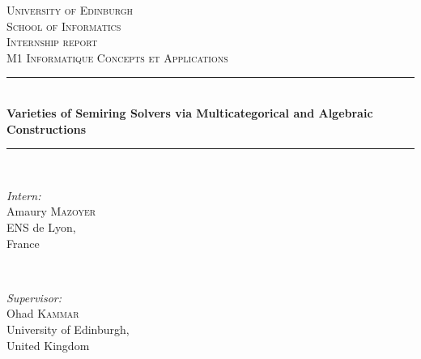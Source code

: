\documentclass[11pt]{article}
\begin{document}
\begin{titlepage}

\newcommand{\HRule}{\rule{\linewidth}{0.5mm}} %

\centering %
 

\textsc{\LARGE University of Edinburgh}\\[0.2cm]
\textsc{\Large School of Informatics}\\[1.5cm] 
\textsc{\Large Internship report}\\[0.4cm]
\textsc{\large M1 Informatique Concepts et Applications}\\[0.5cm]


\HRule \\[0.4cm]
{ \huge \bfseries Varieties of Semiring Solvers via Multicategorical and Algebraic Constructions}\\[0.4cm]
\HRule \\[1.5cm]
 

\begin{minipage}{0.4\textwidth}
\begin{flushleft} \large
\emph{Intern:}\\
Amaury \textsc{Mazoyer}\\
ENS de Lyon,\\
France
\end{flushleft}
\end{minipage}
~
\begin{minipage}{0.4\textwidth}
\begin{flushright} \large
\emph{Supervisor:} \\
Ohad \textsc{Kammar}\\
University of Edinburgh,\\
United Kingdom
\end{flushright}
\end{minipage}\\[1.5cm]



\end{titlepage}
\end{document}
